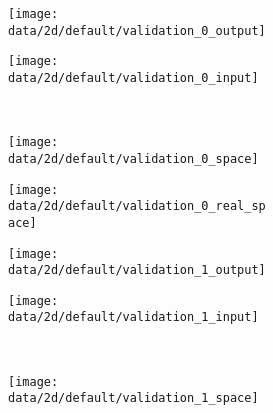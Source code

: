 \begin{figure}
  \centering
  \begin{subfigure}[]{0.125\textwidth}
    \vfill
    \vfill
  \end{subfigure}
  \begin{subfigure}[t]{0.25\textwidth}
    \begin{subfigure}[t]{0.49\textwidth}
      \texttt{[image: data/2d/default/validation\_0\_output]}
    \end{subfigure}\hfill
    \begin{subfigure}[t]{0.49\textwidth}
      \texttt{[image: data/2d/default/validation\_0\_input]}
    \end{subfigure}\\[-2px]
    \begin{subfigure}[t]{0.49\textwidth}
      \texttt{[image: data/2d/default/validation\_0\_space]}
    \end{subfigure}\hfill
    \begin{subfigure}[t]{0.49\textwidth}
      \texttt{[image: data/2d/default/validation\_0\_real\_space]}
    \end{subfigure}
  \end{subfigure}
  \begin{subfigure}[t]{0.25\textwidth}
    \begin{subfigure}[t]{0.49\textwidth}
      \texttt{[image: data/2d/default/validation\_1\_output]}
    \end{subfigure}\hfill
    \begin{subfigure}[t]{0.49\textwidth}
      \texttt{[image: data/2d/default/validation\_1\_input]}
    \end{subfigure}\\[-2px]
    \begin{subfigure}[t]{0.49\textwidth}
      \texttt{[image: data/2d/default/validation\_1\_space]}
    \end{subfigure}\hfill

\end{subfigure}
\end{figure}

